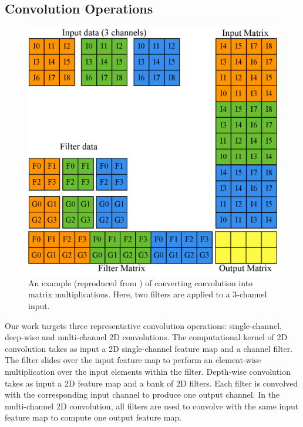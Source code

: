 \subsection{Convolution Operations}
\begin{figure}[t!]
\centering
  \includegraphics[width=0.85\columnwidth]{./figure/convlowering.eps}
  \caption{An example (reproduced from \cite{ChetlurWVCTCS14}) of converting convolution into matrix multiplications. Here, two filters are applied to a 3-channel input.}
  \label{fig:convlowering}
  \vspace{-3mm}
\end{figure}

Our work targets three representative convolution operations: single-channel, deep-wise and multi-channel 2D convolutions. The
computational kernel of 2D convolution takes as input a 2D single-channel feature map and a channel filter. The filter slides over the
input feature map to perform an element-wise multiplication over the input elements within the filter. Depth-wise convolution takes as
input a 2D feature map and a bank of 2D filters. Each filter is convolved with the corresponding input channel to produce one output
channel. In the multi-channel 2D convolution, all filters are used to convolve with the same input feature map to compute one output
feature map.



